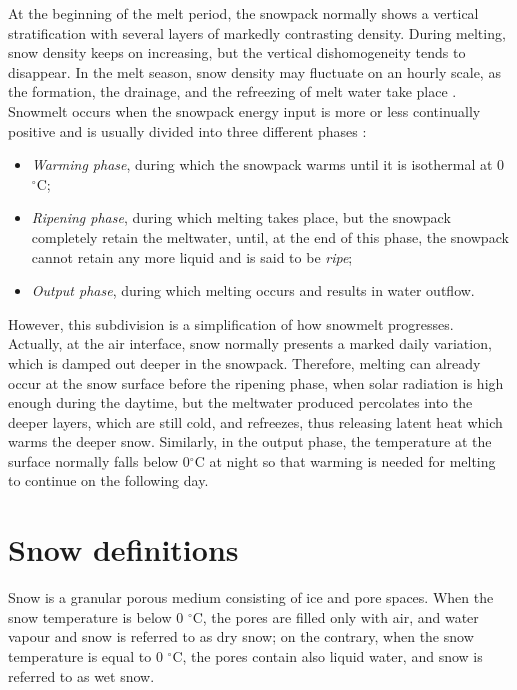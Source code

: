 At the beginning of the melt period, the snowpack normally shows a vertical stratification with several layers of markedly contrasting density. During melting, snow density keeps on increasing, but the vertical dishomogeneity tends to disappear. In the melt season, snow density may fluctuate on an hourly scale, as the formation, the drainage, and the refreezing of melt water take place \citep{Dingman1994}.
Snowmelt occurs when the snowpack energy input is more or less continually positive and is usually divided into three different phases \citep{Dingman1994}:
\begin{itemize}
  \item \emph{Warming phase}, during which the snowpack warms until it is isothermal at 0 $^\circ$C; 
  \item \emph{Ripening phase}, during which melting takes place, but the snowpack completely retain the meltwater, until, at the end of this phase, the snowpack cannot retain any more liquid and is said to be \emph{ripe};
  \item \emph{Output phase}, during which melting occurs and results in water outflow.
\end{itemize}
However, this subdivision is a simplification of how snowmelt progresses. Actually, at the air interface, snow normally presents a marked daily variation, which is damped out deeper in the snowpack. Therefore, melting can already occur at the snow surface before the ripening phase, when solar radiation is high enough during the daytime, but the meltwater produced percolates into the deeper layers, which are still cold, and refreezes, thus releasing latent heat which warms the deeper snow. Similarly, in the output phase, the temperature at the surface normally falls below 0$^\circ$C at night so that warming is needed for melting to continue on the following day. 


\section{Snow definitions}
Snow is a granular porous medium consisting of ice and pore spaces. When the snow temperature is below 0 $^\circ$C, the pores are filled only with air, and water vapour and snow is referred to as dry snow; on the contrary, when the snow temperature is equal to 0 $^\circ$C, the pores contain also liquid water, and snow is referred to as wet snow. 

